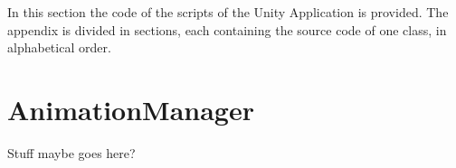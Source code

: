 \lstset{language=[Sharp]C,
	aboveskip=\medskipamount,
	belowskip=\medskipamount
}

In this section the code of the scripts of the Unity Application is provided. The appendix is divided in sections, each containing the source code of one class, in alphabetical order.

\section{AnimationManager}
Stuff maybe goes here?